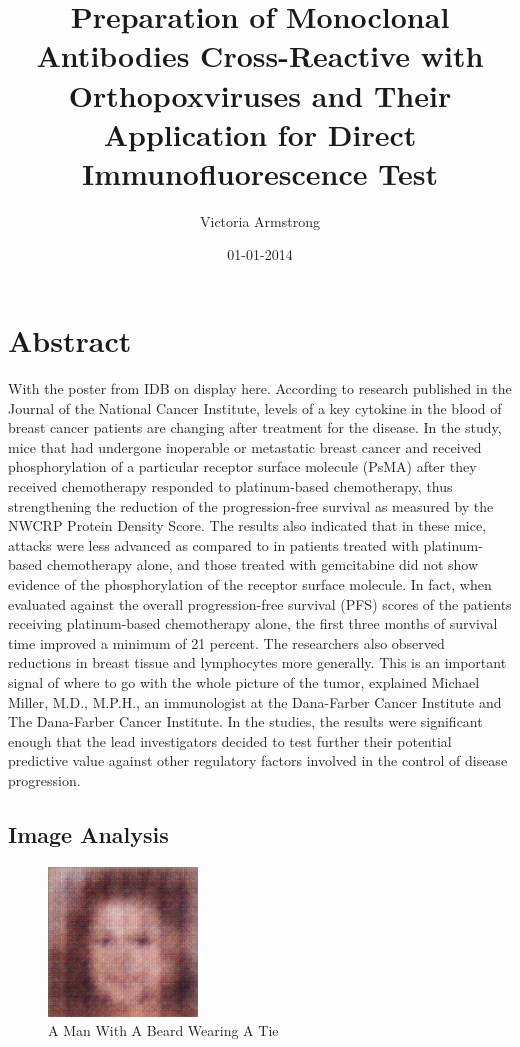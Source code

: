 \documentclass{article}%
\title{Preparation of Monoclonal Antibodies Cross{-}Reactive with Orthopoxviruses and Their Application for Direct Immunofluorescence Test}%
\author{Victoria Armstrong}%
\affil{Blood Transfusion Centre of Slovenia, Ljubljana, Slovenia}%
\date{01{-}01{-}2014}%
\begin{document}
%
\normalsize%
\maketitle%
\section{Abstract}%
\label{sec:Abstract}%
With the poster from IDB on display here.\newline%
According to research published in the Journal of the National Cancer Institute, levels of a key cytokine in the blood of breast cancer patients are changing after treatment for the disease.\newline%
In the study, mice that had undergone inoperable or metastatic breast cancer and received phosphorylation of a particular receptor surface molecule (PsMA) after they received chemotherapy responded to platinum{-}based chemotherapy, thus strengthening the reduction of the progression{-}free survival as measured by the NWCRP Protein Density Score.\newline%
The results also indicated that in these mice, attacks were less advanced as compared to in patients treated with platinum{-}based chemotherapy alone, and those treated with gemcitabine did not show evidence of the phosphorylation of the receptor surface molecule.\newline%
In fact, when evaluated against the overall progression{-}free survival (PFS) scores of the patients receiving platinum{-}based chemotherapy alone, the first three months of survival time improved a minimum of 21 percent. The researchers also observed reductions in breast tissue and lymphocytes more generally.\newline%
This is an important signal of where to go with the whole picture of the tumor, explained Michael Miller, M.D., M.P.H., an immunologist at the Dana{-}Farber Cancer Institute and The Dana{-}Farber Cancer Institute.\newline%
In the studies, the results were significant enough that the lead investigators decided to test further their potential predictive value against other regulatory factors involved in the control of disease progression.

%
\subsection{Image Analysis}%
\label{subsec:ImageAnalysis}%


\begin{figure}[h!]%
\centering%
\includegraphics[width=150px]{500_fake_images/samples_5_63.png}%
\caption{A Man With A Beard Wearing A Tie}%
\end{figure}

%
\end{document}
